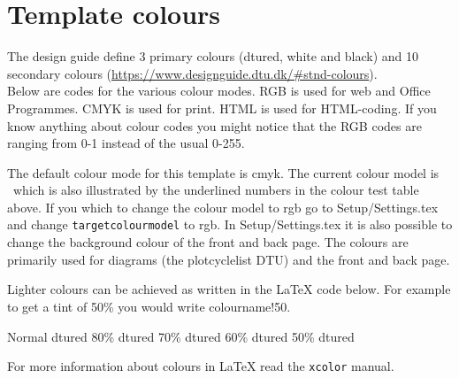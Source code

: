 \chapter{Template colours} \label{sec:colours}
The design guide define 3 primary colours (dtured, white and black) and 10 secondary colours (\url{https://www.designguide.dtu.dk/\#stnd-colours}).\\
Below are codes for the various colour modes. RGB is used for web and Office Programmes. CMYK is used for print. HTML is used for HTML-coding. If you know anything about colour codes you might notice that the RGB codes are ranging from 0-1 instead of the usual 0-255.

\begin{testcolors}
\end{testcolors}

The default colour mode for this template is cmyk. The current colour model is \targetcolourmodel~which is also illustrated by the underlined numbers in the colour test table above.  If you which to change the colour model to rgb go to Setup/Settings.tex and change \texttt{targetcolourmodel} to rgb. In Setup/Settings.tex it is also possible to change the background colour of the front and back page. The colours are primarily used for diagrams (the plotcyclelist DTU) and the front and back page.

Lighter colours can be achieved as written in the \LaTeX{} code below. For example to get a tint of 50\% you would write colourname!50.  \newline
{\raggedright
\textcolor{dtured}{Normal dtured} \qquad
\textcolor{dtured!80}{80\% dtured} \qquad 
\textcolor{dtured!70}{70\% dtured} \qquad
\textcolor{dtured!60}{60\% dtured} \qquad
\textcolor{dtured!50}{50\% dtured} 
}
\newline
For more information about colours in \LaTeX{} read the \texttt{xcolor} manual.

